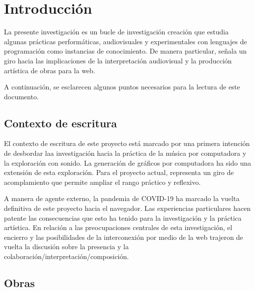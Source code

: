 



\chapter{Introducción}


La presente investigación es un bucle de investigación creación que estudia algunas prácticas performáticas, audiovisuales y experimentales con lenguajes de programación como instancias de conocimiento. De manera particular, señala un giro hacia las implicaciones de la interpretación audiovisual y la producción artística de obras para la web.

A continuación, se esclarecen algunos puntos necesarios para la lectura de este documento. 


\section{Contexto de escritura} %

El contexto de escritura de este proyecto está marcado por una primera intención de desbordar laa investigación hacia la práctica de la música por computadora y la exploración con sonido. La generación de gráficos por computadora ha sido una extensión de esta exploración. Para el proyecto actual, representa un giro de acomplamiento que permite ampliar el rango práctico y reflexivo.

A manera de agente externo, la pandemia de COVID-19 ha marcado la vuelta definitiva de este proyecto hacia el navegador. Las experiencias particulares hacen patente las consecuencias que esto ha tenido para la investigación y la práctica artística. En relación a las preocupaciones centrales de esta investigación, el encierro y las posibilidades de la interconexión por medio de la web trajeron de vuelta la discusión sobre la presencia y la colaboración/interpretación/composición. 

\section{Obras}

